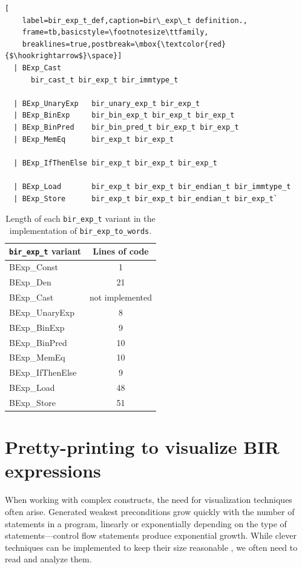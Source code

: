 \documentclass{kththesis}
\begin{document}
{\begin{lstlisting}[
    label=bir_exp_t_def,caption=bir\_exp\_t definition.,
    frame=tb,basicstyle=\footnotesize\ttfamily,
    breaklines=true,postbreak=\mbox{\textcolor{red}{$\hookrightarrow$}\space}]
  | BExp_Cast
  	  bir_cast_t bir_exp_t bir_immtype_t

  | BExp_UnaryExp   bir_unary_exp_t bir_exp_t
  | BExp_BinExp     bir_bin_exp_t bir_exp_t bir_exp_t
  | BExp_BinPred    bir_bin_pred_t bir_exp_t bir_exp_t
  | BExp_MemEq      bir_exp_t bir_exp_t

  | BExp_IfThenElse bir_exp_t bir_exp_t bir_exp_t

  | BExp_Load       bir_exp_t bir_exp_t bir_endian_t bir_immtype_t
  | BExp_Store      bir_exp_t bir_exp_t bir_endian_t bir_exp_t`
\end{lstlisting}

\begin{table}[ht!]
    \centering
    \begin{tabular}{ | l | c | }
        \hline
        \texttt{bir\_exp\_t} variant & Lines of code\\
        \hline
        BExp\_Const & 1\\
        BExp\_Den & 21\\
        BExp\_Cast & not implemented\\
        BExp\_UnaryExp & 8\\
        BExp\_BinExp & 9\\
        BExp\_BinPred & 10\\
        BExp\_MemEq & 10\\
        BExp\_IfThenElse & 9\\
        BExp\_Load & 48\\
        BExp\_Store & 51\\
        \hline
    \end{tabular}
    \caption{Length of each \texttt{bir\_exp\_t} variant in the implementation of \texttt{bir\_exp\_to\_words}.}
    \label{bir_exp_to_words_variants_loc}
\end{table}

\section{Pretty-printing to visualize BIR expressions} \label{pretty-printers}

When working with complex constructs, the need for visualization techniques often arise. Generated weakest preconditions grow quickly with the number of statements in a program, linearly or exponentially depending on the type of statements---control flow statements produce exponential growth. While clever techniques can be implemented to keep their size reasonable \cite{lindner_trabin:_2019}, we often need to read and analyze them.

}
\end{document}
